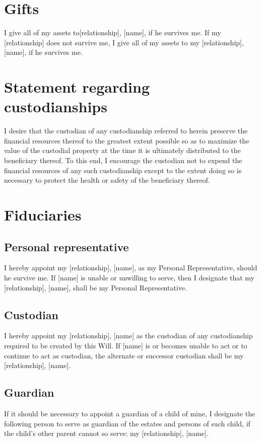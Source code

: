 \documentclass[11.5pt]{article}
\begin{document}
\section{Gifts}
I give all of my assets to[relationship], [name], if he survives me. If my [relationship] does not survive me, I give all of my assets to my [relationship], [name], if he survives me. 

\section{Statement regarding custodianships}
I desire that the custodian of any custodianship referred to herein preserve the financial resources thereof to the greatest extent possible so as to maximize the value of the custodial property at the time it is ultimately distributed to the beneficiary thereof. To this end, I encourage the custodian not to expend the financial resources of any such custodianship except to the extent doing so is necessary to protect the health or safety of the beneficiary thereof.

\section{Fiduciaries}
\subsection{Personal representative}
I hereby appoint my [relationship], [name], as my Personal Representative, should he survive me. If [name] is unable or unwilling to serve, then I designate that my [relationship], [name], shall be my Personal Representative. 

\subsection{Custodian}
I hereby appoint my [relationship], [name] as the custodian of any custodianship required to be created by this Will. If [name] is or becomes unable to act or to continue to act as custodian, the alternate or successor custodian shall be my [relationship], [name].

\subsection{Guardian}
If it should be necessary to appoint a guardian of a child of mine, I designate the following person to serve as guardian of the estates and persons of such child, if the child’s other parent cannot so serve: my [relationship], [name].
\end{document}
